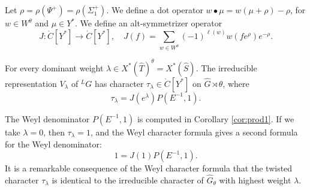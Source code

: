 Let $\rho = \rho(\Psi^+) = \rho(\Sigma^+_1)$.
We define a dot operator $w\bullet \mu = w(\mu+\rho)-\rho$, for $w\in W^\theta$ and $\mu\in Y^*$.
We define an alt-symmetrizer operator
\[
J:\ring{C}[Y^*]\to \ring{C}[Y^*],\quad J(f) = \sum_{w\in W^\theta} (-1)^{\ell(w)} w(f e^\rho) e^{-\rho}.
\]

\begin{theorem}  For every dominant weight $\lambda\in X^*(\hat T)^\theta = X^*(\hat S)$.
The irreducible representation $V_\lambda$ of ${}^LG$ has character $\tau_\lambda\in \ring{C}[Y^*]$ on
$\hat G\rtimes \theta$, where
\[
\tau_\lambda = J(e^\lambda) P(E^{-1},1).
\]
\end{theorem}


The Weyl denominator $P(E^{-1},1)$ is computed in Corollary \ref{cor:prod1}.  
If we take $\lambda=0$, then $\tau_\lambda=1$, and the Weyl character formula gives 
a second formula for the Weyl denominator:
\begin{equation}\label{eqn:wd2}
1= J(1) P(E^{-1},1).
\end{equation}
It is a remarkable consequence
of the Weyl character formula that
the twisted character $\tau_\lambda$ is identical to the irreducible character of 
$\hat G_\theta$ with highest weight $\lambda$.


